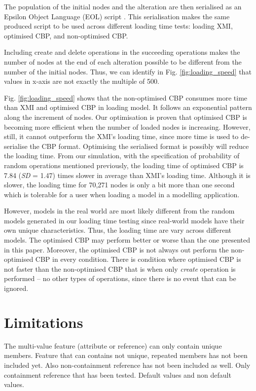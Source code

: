 \documentclass[sigconf]{acmart}
\begin{document}
{The population of the initial nodes and the alteration are then serialised as an Epsilon Object Language (EOL) script \cite{kolovos2006epsilon}. This serialisation makes the same produced script to be used across different loading time tests: loading XMI, optimised CBP, and non-optimised CBP. 

Including create and delete operations in the succeeding operations makes the number of nodes at the end of each alteration possible to be different from the number of the initial nodes. Thus, we can identify in Fig. \ref{fig:loading_speed} that values in x-axis are not exactly the multiple of 500.    

Fig. \ref{fig:loading_speed} shows that the non-optimised CBP consumes more time than XMI and optimised CBP in loading model. It follows an exponential pattern along the increment of nodes. Our optimisation is proven that optimised CBP is becoming more efficient when the number of loaded nodes is increasing. However, still, it cannot outperform the XMI's loading time, since more time is used to de-serialise the CBP format. Optimising the serialised format is possibly will reduce the loading time. From our simulation, with the specification of probability of random operations mentioned previously, the loading time of optimised CBP is 7.84 (\textit{SD} = 1.47) times slower in average than XMI's loading time. Although it is slower, the loading time for 70,271 nodes is only a bit more than one second which is tolerable for a user when loading a model in a modelling application. 

However, models in the real world are most likely different from the random models generated in our loading time testing since real-world models have their own unique characteristics. Thus, the loading time are vary across different models. The optimised CBP may perform better or worse than the one presented in this paper. Moreover, the optimised CBP is not always out perform the non-optimised CBP in every condition. There is condition where optimised CBP is not faster than the non-optimised CBP that is when only \emph{create} operation is performed -- no other types of operations, since there is no event that can be ignored. 

\section{Limitations}
\label{sec:limitations}

The multi-value feature (attribute or reference) can only contain unique members. Feature that can contains not unique, repeated members has not been included yet.  
Also non-containment reference has not been included as well. Only containment reference that has been tested. 
Default values and non default values.

}
\end{document}

